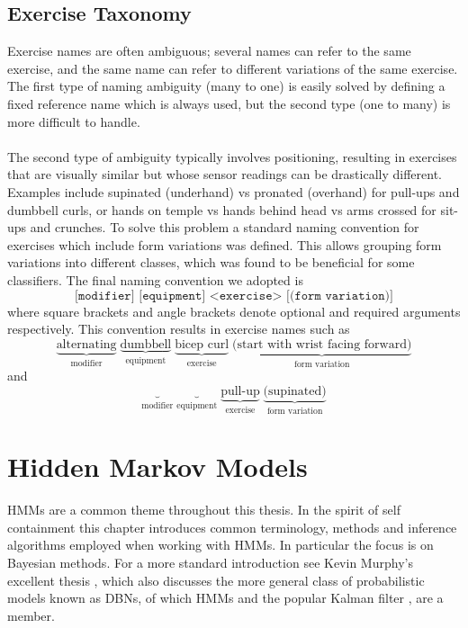 \documentclass[12pt]{report}
\newcommand{\m}[1]{\texttt{#1}}
\newcommand{\1}[0]{\mathbbm{1}}
\begin{document}
\section{Exercise Taxonomy}
\label{sec:Exercise Taxonomy}
Exercise names are often ambiguous; several names can refer to the same exercise,
and the same name can refer to different variations of the same exercise.
The first type of naming ambiguity (many to one) is easily solved by defining a fixed reference name
which is always used, but the second type (one to many) is more difficult to handle.
\\\\
The second type of ambiguity typically involves positioning, resulting in exercises that are visually similar
but whose sensor readings can be drastically different.
Examples include supinated (underhand) vs pronated (overhand) for pull-ups and dumbbell curls,
or hands on temple vs hands behind head vs arms crossed for sit-ups and crunches. To solve this problem
a standard naming convention for exercises which include form variations was defined. This allows grouping
form variations into different classes, which was found to be beneficial for some classifiers.
The final naming convention we adopted is
\[
    \m{[modifier] [equipment] <exercise> [(form variation)]}
\]
where square brackets and angle brackets denote optional and required arguments respectively.
This convention results in exercise names such as
\[
    \underbrace{\text{alternating}}_{\text{modifier}} \; \underbrace{\text{dumbbell}}_{\text{equipment}} \; \underbrace{\text{bicep curl}}_{\text{exercise}} \; \underbrace{\text{(start with wrist facing forward)}}_{\text{form variation}}
\]
and
\[
    \underbrace{}_{\text{modifier}} \; \underbrace{}_{\text{equipment}} \; \underbrace{\text{pull-up}}_{\text{exercise}} \; \underbrace{\text{(supinated)}}_{\text{form variation}}
\]

\chapter{Hidden Markov Models}
\acp{HMM} \cite{rabiner-hmms} are a common theme throughout this thesis.
In the spirit of self containment this chapter introduces common terminology,
methods and inference algorithms employed when working with \acp{HMM}. In particular
the focus is on Bayesian methods. For a more standard introduction see Kevin Murphy's excellent thesis
\cite{murphy-thesis}, which also discusses the more general class of probabilistic models
known as \acp{DBN}, of which \acp{HMM} and the popular Kalman filter \cite{kalman-filter}, are a member.
\end{document}
